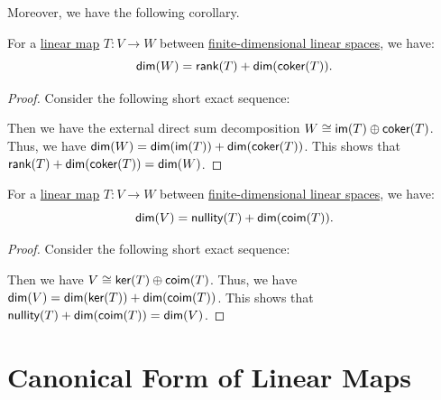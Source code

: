 Moreover, we have the following corollary.
\begin{corollary}
  For a \hyperref[def:linear_map]{linear map} $T \colon V \to W$ between \hyperref[def:finite_dimensional_linear_space]{finite-dimensional linear spaces}, we have:
  \[
    \dim(W) = \rank(T) + \dim(\coker(T)).
  \]
\end{corollary}
\begin{proof}
  Consider the following short exact sequence:
  \begin{center}
  \end{center}
  Then we have the external direct sum decomposition $W \cong \im(T) \oplus \coker(T)$. Thus, we have $\dim(W) = \dim(\im(T)) + \dim(\coker(T))$. This shows that $\rank(T) + \dim(\coker(T)) = \dim(W)$.
\end{proof}

\begin{corollary}
  For a \hyperref[def:linear_map]{linear map} $T \colon V \to W$ between \hyperref[def:finite_dimensional_linear_space]{finite-dimensional linear spaces}, we have:
  \[
    \dim(V) = \nullity(T) + \dim(\coim(T)).
  \]
\end{corollary}
\begin{proof}
  Consider the following short exact sequence:
  \begin{center}
  \end{center}
  Then we have $V \cong \ker(T) \oplus \coim(T)$. Thus, we have $\dim(V) = \dim(\ker(T)) + \dim(\coim(T))$. This shows that $\nullity(T) + \dim(\coim(T)) = \dim(V)$.
\end{proof}

\section{Canonical Form of Linear Maps}

